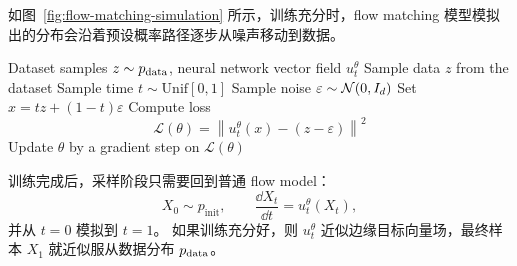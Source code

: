 如图~\ref{fig:flow-matching-simulation} 所示，训练充分时，flow matching 模型模拟出的分布会沿着预设概率路径逐步从噪声移动到数据。

\begin{algorithm}
\caption{Flow Matching Training Procedure for Gaussian CondOT Path}
\begin{algorithmic}[1]
\Require Dataset samples $z \sim p_{\mathrm{data}}$, neural network vector field $u_t^\theta$
    \State Sample data $z$ from the dataset
    \State Sample time $t \sim \mathrm{Unif}[0,1]$
    \State Sample noise $\varepsilon \sim \mathcal{N}(0,I_d)$
    \State Set $x = t z + (1-t)\varepsilon$
    \State Compute loss
    \[
    \mathcal{L}(\theta)
    =
    \left\|
    u_t^\theta(x)-(z-\varepsilon)
    \right\|^2
    \]
    \State Update $\theta$ by a gradient step on $\mathcal{L}(\theta)$
\EndFor
\end{algorithmic}
\end{algorithm}

训练完成后，采样阶段只需要回到普通 flow model：
\begin{equation}
X_0 \sim p_{\mathrm{init}},
\qquad
\frac{\dd X_t}{\dd t}=u_t^\theta(X_t),
\end{equation}
并从 $t=0$ 模拟到 $t=1$。
如果训练充分好，则 $u_t^\theta$ 近似边缘目标向量场，最终样本 $X_1$ 就近似服从数据分布 $p_{\mathrm{data}}$。


